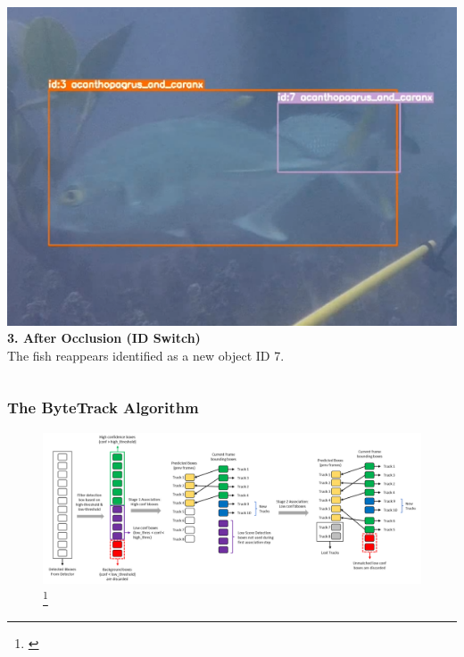 \documentclass[serif]{beamer}  %
\begin{document}
\begin{frame}
\begin{columns}[T,totalwidth=\textwidth]
        \begin{column}{0.32\textwidth}
            \centering
            \includegraphics[width=\linewidth]{images/wrong_occlusion_3.png}
            \vspace{0.5em}
            \tiny
            \textbf{3. After Occlusion (ID Switch)} \\
            The fish reappears identified as a new object ID 7.
        \end{column}
    \end{columns}
\end{frame}


\begin{frame}
    \frametitle{The ByteTrack Algorithm}
    
    \begin{figure}
        \centering
        \includegraphics[width=1\linewidth]{images/bytetrack.png}
        \footnote{\cite{datature2024bytetrack}}
    \end{figure}
    
\end{frame}
\end{document}
